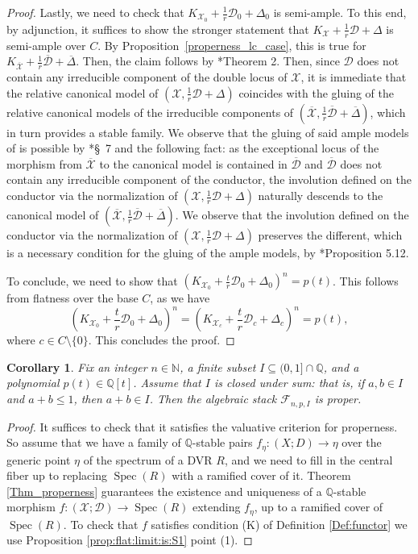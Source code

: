 \documentclass{amsart}
\newcommand{\bQ}{\mathbb{Q}}
\newcommand{\sF}{\mathscr{F}}
\newcommand{\cD}{\mathcal{D}}
\newcommand{\cX}{\mathcal{X}}
\newcommand{\spec}{\operatorname{Spec}}
\newtheorem{Cor}[theorem]{Corollary}
\theoremstyle{definition}
\def\K#1.{K_{#1}}
\begin{document}
\begin{proof}
Lastly, we need to check that $K_{\mathcal{X}_0}+\frac{1}{r} \mathcal{D}_0+\Delta_0$ is semi-ample.
To this end, by adjunction, it suffices to show the stronger statement that $K_{\mathcal{X}}+\frac{1}{r} \mathcal{D}+\Delta$ is semi-ample over $C$.
By Proposition~\ref{properness_lc_case}, this is true for $K_{\overline{\mathcal{X}}}+\frac{1}{r} \overline{\mathcal{D}}+\overline{\Delta}$.
Then, the claim follows by \cite{HX16}*{Theorem 2}.
Then, since $\mathcal{D}$ does not contain any irreducible component of the double locus of $\mathcal{X}$, it is immediate that the relative canonical model of $(\mathcal{X},\frac{1}{r}\mathcal{D}+\Delta)$ coincides with the gluing of the relative canonical models of the irreducible components of $(\overline{\mathcal{X}},\frac{1}{r}\overline{\mathcal{D}}+\overline{\Delta})$, which in turn provides a stable family.
We observe that the gluing of said ample models of is possible by \cite{HX13}*{\S~7} and the following fact: as the exceptional locus of the morphism from $\overline{\mathcal{X}}$ to the canonical model is contained in $\overline{\mathcal{D}}$ and $\overline{\mathcal{D}}$ does not contain any irreducible component of the conductor, the involution defined on the conductor via the normalization of $(\mathcal{X},\frac{1}{r}\mathcal{D}+\Delta)$ naturally descends to the canonical model of $(\overline{\mathcal{X}},\frac{1}{r}\overline{\mathcal{D}}+\overline{\Delta})$.
We observe that the involution defined on the conductor via the normalization of $(\mathcal{X},\frac{1}{r}\mathcal{D}+\Delta)$ preserves the different, which is a necessary condition for the gluing of the ample models, by \cite{Kol13}*{Proposition 5.12}.


To conclude, we need to show that $(\K \cX_0. + \frac{t}{r}\cD_0 + \Delta_0)^n=p(t)$.
This follows from flatness over the base $C$, as we have
\[
(\K \cX_0. + \frac{t}{r}\cD_0 + \Delta_0)^n = (\K \cX_c. + \frac{t}{r}\cD_c + \Delta_c)^n = p(t),
\]
where $c \in C \setminus \{ 0 \}$.
This concludes the proof.
\end{proof}

\begin{Cor}Fix an integer $n\in \mathbb{N}$, a finite subset $I\subseteq (0,1] \cap \mathbb{Q}$, and a polynomial $p(t) \in \mathbb{Q}[t]$.
Assume that $I$ is closed under sum: that is, if $a,b \in I$ and $a+b \leq 1$, then $a+b \in I$. Then the algebraic stack $\sF_{n,p,I}$ is proper.
\end{Cor}
\begin{proof}
It suffices to check that it satisfies the valuative criterion for properness. So assume that we have a family of $\bQ$-stable pairs $f_\eta \colon (X;D)\to \eta$ over the generic point $\eta$ of the spectrum of a DVR $R$, and we need to fill in the central fiber up to replacing $\spec(R)$ with a ramified cover of it. Theorem \ref{Thm_properness} guarantees the existence and uniqueness of a $\bQ$-stable morphism $f \colon (\cX;\cD)\to \spec(R)$ extending $f_\eta$, up to a ramified cover of $\spec(R)$. To check that $f$ satisfies condition (K) of Definition \ref{Def:functor} we use Proposition \ref{prop:flat:limit:is:S1} point (1).
\end{proof}
\end{document}
